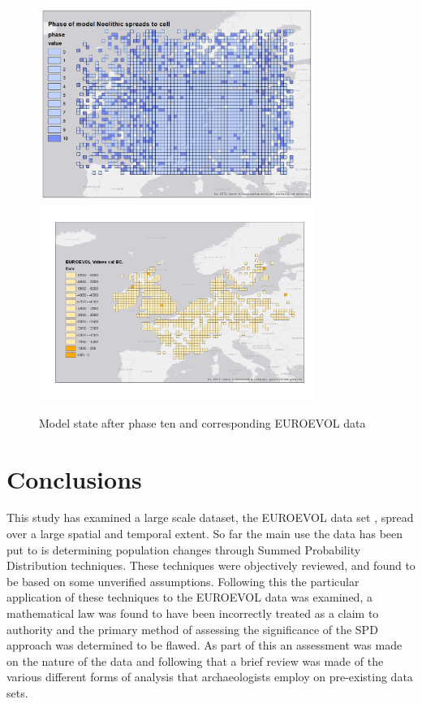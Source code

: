 \begin{figure}
\centering
	\includegraphics[width=0.8\textwidth]{figures/model-10}
	\includegraphics[width=0.8\textwidth]{figures/euroevol-10}
  \caption{Model state after phase ten and corresponding EUROEVOL data}
  \label{fig:compare10}
\end{figure}

\section{Conclusions}
This study has examined a large scale dataset, the EUROEVOL data set \citep{Manning:2016fk}, spread over a large spatial and temporal extent. So far the main use the data has been put to is determining population changes through Summed Probability Distribution techniques. These techniques were objectively reviewed, and found to be based on some unverified assumptions. Following this the particular application of these techniques to the EUROEVOL data was examined, a mathematical law was found to have been incorrectly treated as a claim to authority and the primary method of assessing the significance of the SPD approach was determined to be flawed. As part of this an assessment was made on the nature of the data and following that a brief review was made of the various different forms of analysis that archaeologists employ on pre-existing data sets.

